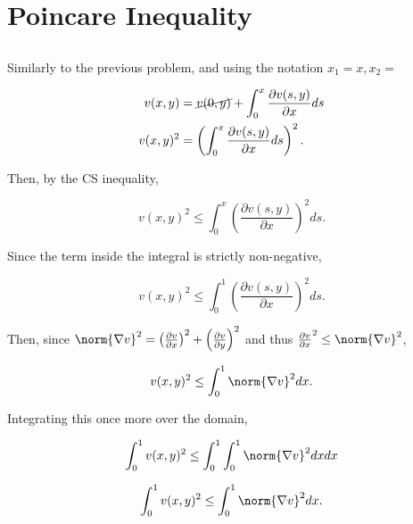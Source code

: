 \documentclass{hw-template}
\begin{document}

\section{Poincare Inequality}

\subsection{}

Similarly to the previous problem, and using the notation $x_1 = x, x_2 =$

\begin{align}
    v(x, y) &= \cancel{v(0, y)} + \int_0^x \frac{\partial v(s, y)}{\partial x} ds\\
    v(x, y)^2 &= \left(\int_0^x \frac{\partial v(s, y)}{\partial x} ds \right)^2.
\end{align}

Then, by the CS inequality,

\begin{equation}
    v(x, y)^2 \leq \int_0^x \left({\frac{\partial v(s, y)}{\partial x}}\right)^2 ds.
\end{equation}

Since the term inside the integral is strictly non-negative, 

\begin{equation}
    v(x, y)^2 \leq \int_0^1 \left({\frac{\partial v(s, y)}{\partial x}}\right)^2 ds.
\end{equation}

Then, since $\norm{\nabla v}^2 = \left(\frac{\partial v}{\partial x} \right)^2 + \left(\frac{\partial v}{\partial y} \right)^2$ and thus $\frac{\partial v}{\partial x}^2 \leq \norm{\nabla v}^2$,

\begin{equation}
    v(x, y)^2 \leq \int_0^1  \norm{\nabla v}^2   dx.
\end{equation}

Integrating this once more over the domain,

\begin{equation}
    \int_0^1 v(x, y)^2 \leq \int_0^1\int_0^1  \norm{\nabla v}^2   dx dx
\end{equation}

\begin{equation}
    \int_0^1 v(x, y)^2 \leq \int_0^1  \norm{\nabla v}^2   dx.
\end{equation}

\subsection{}
\end{document}
